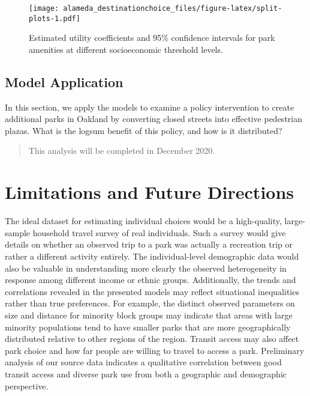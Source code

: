 \documentclass[]{elsarticle} %
\makeatletter
\def\maxwidth{\ifdim\Gin@nat@width>\linewidth\linewidth
\else\Gin@nat@width\fi}
\let\Oldincludegraphics\includegraphics
\renewcommand{\includegraphics}[1]{\Oldincludegraphics[width=\maxwidth]{#1}}
\makeatother
\begin{document}
\begin{figure}
\centering
\texttt{[image: alameda\_destinationchoice\_files/figure-latex/split-plots-1.pdf]}
\caption{\label{fig:split-plots}Estimated utility coefficients and 95\% confidence intervals for park amenities at different socioeconomic threshold levels.}
\end{figure}

\hypertarget{model-application}{%
\subsection{Model Application}\label{model-application}}

In this section, we apply the models to examine a policy intervention to create
additional parks in Oakland by converting closed streets into effective
pedestrian plazas. What is the logsum benefit of this policy, and how is it
distributed?

\begin{quote}
This analysis will be completed in December 2020.
\end{quote}

\hypertarget{limitations-and-future-directions}{%
\section{Limitations and Future Directions}\label{limitations-and-future-directions}}

The ideal dataset for estimating individual choices would be a high-quality,
large-sample household travel survey of real individuals. Such a survey would
give details on whether an observed trip to a park was actually a recreation
trip or rather a different activity entirely. The individual-level demographic
data would also be valuable in understanding more clearly the observed
heterogeneity in response among different income or ethnic groups. Additionally,
the trends and correlations revealed in the presented models may reflect
situational inequalities rather than true preferences. For example, the
distinct observed parameters on size and distance for minority block groups may
indicate that areas with large minority populations tend to have smaller parks
that are more geographically distributed relative to other regions of the region.
Transit access may also affect park choice and how far people are willing to
travel to access a park. Preliminary analysis of our source data indicates a
qualitative correlation between good transit access and diverse park use from
both a geographic and demographic perspective.
\end{document}
